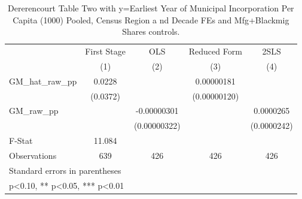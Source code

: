 \begin{table}[htbp]\centering
\def\sym#1{\ifmmode^{#1}\else\(^{#1}\)\fi}
\caption{Dererencourt Table Two with y=Earliest Year of Municipal Incorporation Per Capita (1000) Pooled, Census Region a nd Decade FEs and Mfg+Blackmig Shares controls.}
\begin{tabular}{l*{4}{c}}
\toprule
                    & First Stage   &         OLS   &Reduced Form   &        2SLS   \\
                    &\multicolumn{1}{c}{(1)}   &\multicolumn{1}{c}{(2)}   &\multicolumn{1}{c}{(3)}   &\multicolumn{1}{c}{(4)}   \\
\midrule
GM\_hat\_raw\_pp       &      0.0228   &               &  0.00000181   &               \\
                    &    (0.0372)   &               &(0.00000120)   &               \\
\addlinespace
GM\_raw\_pp           &               & -0.00000301   &               &   0.0000265   \\
                    &               &(0.00000322)   &               & (0.0000242)   \\
\midrule
F-Stat              &      11.084   &               &               &               \\
Observations        &         639   &         426   &         426   &         426   \\
\bottomrule
\multicolumn{5}{l}{\footnotesize Standard errors in parentheses}\\
\multicolumn{5}{l}{\footnotesize * p<0.10, ** p<0.05, *** p<0.01}\\
\end{tabular}
\end{table}
